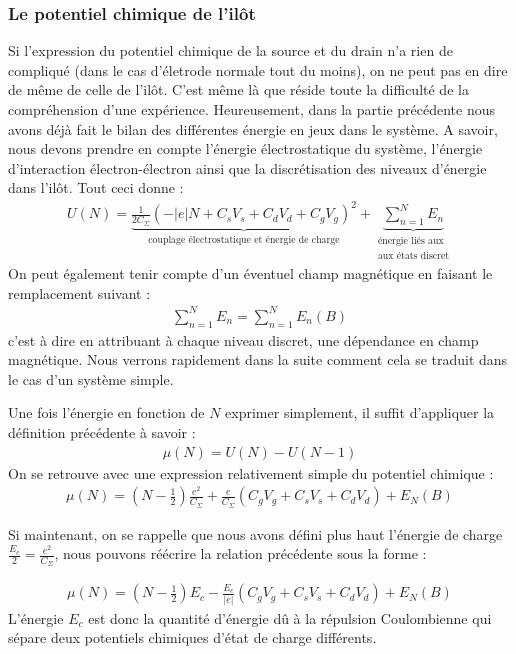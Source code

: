 \subsubsection{Le potentiel chimique de l'il\^ot}
Si l'expression du potentiel chimique de la source et du drain n'a rien de compliqué (dans le cas d'életrode normale tout du moins), on ne peut pas en dire de m\^eme de celle de l'il\^ot. C'est m\^eme là que réside toute la difficulté de la compréhension d'une expérience. Heureusement, dans la partie précédente nous avons déjà fait le bilan des différentes énergie en jeux dans le système. A savoir, nous devons prendre en compte l'énergie électrostatique du système, l'énergie d'interaction électron-électron ainsi que la discrétisation des niveaux d'énergie dans l'il\^ot. Tout ceci donne :
\begin{eqnarray}
U(N) = \underbrace{\frac{1}{2C_{\Sigma}} (-|e|N + C_sV_s + C_dV_d + C_gV_g)^2}_{\text{couplage électrostatique et énergie de charge}}
+ 
\underbrace{\sum_{n=1}^{N} E_n}_{\substack{\text{énergie liés aux} \\\text{aux états discret}}}
\end{eqnarray}
On peut également tenir compte d'un éventuel champ magnétique en faisant le remplacement suivant :
\begin{eqnarray}
\sum_{n=1}^N E_n = \sum_{n=1}^N E_n(B) \nonumber
\end{eqnarray}
c'est à dire en attribuant à chaque niveau discret, une dépendance en champ magnétique. Nous verrons rapidement dans la suite comment cela se traduit dans le cas d'un système simple. 

Une fois l'énergie en fonction de $N$ exprimer simplement, il suffit d'appliquer la définition précédente à savoir :
\begin{eqnarray}
\mu(N) = U(N) - U(N-1) \nonumber
\end{eqnarray}
On se retrouve avec une expression relativement simple du potentiel chimique :
\begin{eqnarray}
\mu(N) = (N-\frac{1}{2})\frac{e^2}{C_{\Sigma}}
+ 
\frac{e}{C_{\Sigma}}(C_gV_g + C_sV_s + C_dV_d)
+
E_N(B)
\end{eqnarray}

Si maintenant, on se rappelle que nous avons défini plus haut l'énergie de charge $\frac{E_c}{2} = \frac{e^2}{C_{\Sigma}}$, nous pouvons réécrire la relation précédente sous la forme :

\begin{eqnarray}
\mu(N) = (N-\frac{1}{2})E_c
- 
\frac{E_c}{|e|}(C_gV_g + C_sV_s + C_dV_d)
+
E_N(B)
\label{pot_chim}
\end{eqnarray}
L'énergie $E_c$ est donc la quantité d'énergie d\^u à la répulsion Coulombienne qui sépare deux potentiels chimiques d'état de charge différents.


